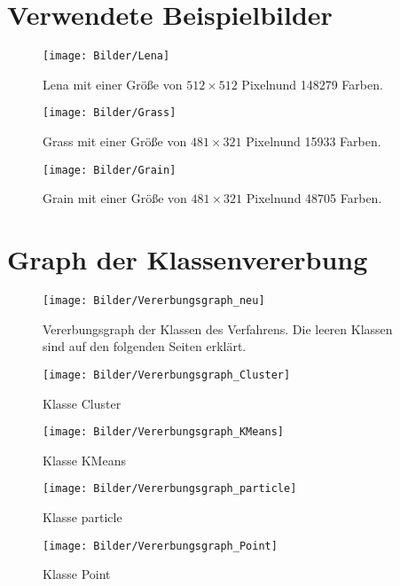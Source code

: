 \section{Verwendete Beispielbilder}\label{Beispielbilder}
\begin{figure}[H]
\centering
\texttt{[image: Bilder/Lena]}
\caption{\glqq Lena\grqq\space\cite{BerkeleyDB} mit einer Größe von $512\times512$ Pixeln\newline und 148279 Farben.}
\label{BspLena}
\end{figure}

\begin{figure}[p]
\centering
\texttt{[image: Bilder/Grass]}
\caption{\glqq Grass\grqq\space\cite{BerkeleyDB} mit einer Größe von $481\times321$ Pixeln\newline und 15933 Farben.}
\label{BspGrass}
\end{figure}
  
\begin{figure}[p]
\centering
\texttt{[image: Bilder/Grain]}
\caption{\glqq Grain\grqq\space\cite{BerkeleyDB} mit einer Größe von $481\times321$ Pixeln\newline und 48705 Farben.}
\label{BspGrain}
\end{figure}
  

\section{Graph der Klassenvererbung}
  \begin{figure}[H]
    \centering
    \texttt{[image: Bilder/Vererbungsgraph\_neu]}
    \caption{Vererbungsgraph der Klassen des Verfahrens. Die leeren Klassen sind auf den folgenden Seiten erklärt.}
    \label{Vererbungsgraph}
  \end{figure}
  \begin{figure}[p]
    \centering
    \texttt{[image: Bilder/Vererbungsgraph\_Cluster]}
    \caption{Klasse Cluster}
    \label{Vererbungsgraph}
  \end{figure}
  \begin{figure}[p]
    \centering
    \texttt{[image: Bilder/Vererbungsgraph\_KMeans]}
    \caption{Klasse KMeans}
    \label{Vererbungsgraph}
  \end{figure}
  \begin{figure}[p]
    \centering
    \texttt{[image: Bilder/Vererbungsgraph\_particle]}
    \caption{Klasse particle}
    \label{Vererbungsgraph}
  \end{figure}
  \begin{figure}[p]
    \centering
    \texttt{[image: Bilder/Vererbungsgraph\_Point]}
    \caption{Klasse Point}
    \label{Vererbungsgraph}
  \end{figure}

